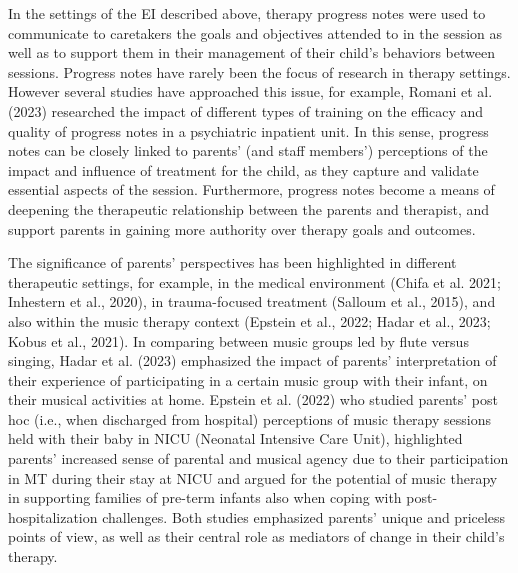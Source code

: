\documentclass[authordate, empirical, issue]{jote-new-article}
\begin{document}
In the settings of the EI described above, therapy progress notes were used to communicate to caretakers the goals and objectives attended to in the session as well as to support them in their management of their child's behaviors between sessions. Progress notes have rarely been the focus of research in therapy settings. However several studies have approached this issue, for example, Romani et al. (2023) researched the impact of different types of training on the efficacy and quality of progress notes in a psychiatric inpatient unit. In this sense, progress notes can be closely linked to parents' (and staff members') perceptions of the impact and influence of treatment for the child, as they capture and validate essential aspects of the session. Furthermore, progress notes become a means of deepening the therapeutic relationship between the parents and therapist, and support parents in gaining more authority over therapy goals and outcomes.



The significance of parents' perspectives has been highlighted in different therapeutic settings, for example, in the medical environment (Chifa et al. 2021; Inhestern et al., 2020), in trauma-focused treatment (Salloum et al., 2015), and also within the music therapy context (Epstein et al., 2022; Hadar et al., 2023; Kobus et al., 2021). In comparing between music groups led by flute versus singing, Hadar et al. (2023) emphasized the impact of parents' interpretation of their experience of participating in a certain music group with their infant, on their musical activities at home. Epstein et al. (2022) who studied parents' post hoc (i.e., when discharged from hospital) perceptions of music therapy sessions held with their baby in NICU (Neonatal Intensive Care Unit), highlighted parents' increased sense of parental and musical agency due to their participation in MT during their stay at NICU and argued for the potential of music therapy in supporting families of pre-term infants also when coping with post-hospitalization challenges. Both studies emphasized parents' unique and priceless points of view, as well as their central role as mediators of change in their child's therapy.
\end{document}
